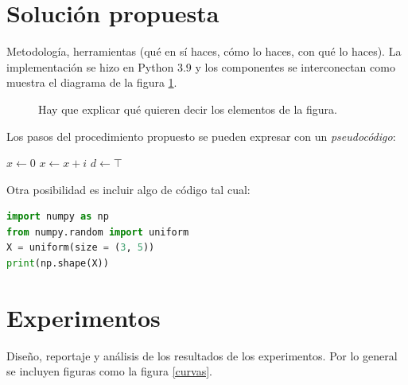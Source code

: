 \documentclass[a1]{sciposter} %
\begin{document}
\begin{multicols}{2}
\section{Solución propuesta}

Metodología, herramientas (qué en sí haces, cómo lo haces, con qué lo
haces).  La implementación se hizo en Python 3.9 \citep{python} y los
componentes se interconectan como muestra el diagrama de la figura
\ref{diag}.

\begin{figure}
\captionsetup{type=figure} %
\setcounter{figure}{0} %
\begin{center}
\end{center}
\caption{Hay que explicar qué quieren decir los elementos de la figura.}
\label{diag}
\end{figure}

Los pasos del procedimiento propuesto se pueden expresar con un {\em pseudocódigo}:

\begin{algorithmic}[1]
\State $x \leftarrow 0$
	\State $x \leftarrow x + i$
\EndFor
{}
    \State $d \leftarrow \top$
\EndIf
\end{algorithmic} 

Otra posibilidad es incluir algo de código tal cual:
\begin{lstlisting}[language=Python, caption=Procedimiento del segundo paso]
import numpy as np
from numpy.random import uniform
X = uniform(size = (3, 5))
print(np.shape(X))
\end{lstlisting}

\section{Experimentos}

Diseño, reportaje y análisis de los resultados de los
experimentos. Por lo general se incluyen figuras como la figura
\ref{curvas}.


\end{multicols}
\end{document}
